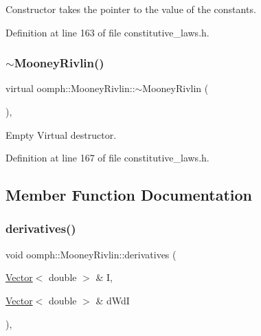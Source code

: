 Constructor takes the pointer to the value of the constants. 



Definition at line 163 of file constitutive\+\_\+laws.\+h.

\mbox{\label{classoomph_1_1MooneyRivlin_a8ac6843acd4229d6b53af7a06b0d7363}} 
\subsubsection{\texorpdfstring{$\sim$\+Mooney\+Rivlin()}{~MooneyRivlin()}}
{\footnotesize\ttfamily virtual oomph\+::\+Mooney\+Rivlin\+::$\sim$\+Mooney\+Rivlin (\begin{DoxyParamCaption}{ }\end{DoxyParamCaption})\hspace{0.3cm}{\ttfamily [inline]}, {\ttfamily [virtual]}}



Empty Virtual destructor. 



Definition at line 167 of file constitutive\+\_\+laws.\+h.



\subsection{Member Function Documentation}
\mbox{\label{classoomph_1_1MooneyRivlin_a01ff4e87c76813d6a9e528bd896a2bae}} 
\subsubsection{\texorpdfstring{derivatives()}{derivatives()}}
{\footnotesize\ttfamily void oomph\+::\+Mooney\+Rivlin\+::derivatives (\begin{DoxyParamCaption}\item[{\hyperlink{classoomph_1_1Vector}{Vector}$<$ double $>$ \&}]{I,  }\item[{\hyperlink{classoomph_1_1Vector}{Vector}$<$ double $>$ \&}]{d\+WdI }\end{DoxyParamCaption})\hspace{0.3cm}{\ttfamily [inline]}, {\ttfamily [virtual]}}



